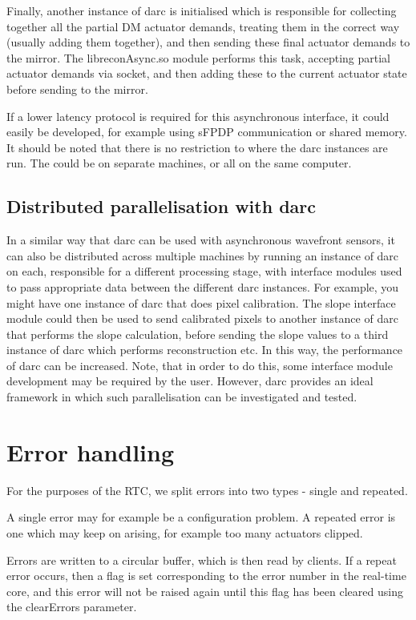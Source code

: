 \documentclass[a4,10pt]{article}
\begin{document}
Finally, another instance of darc is initialised which is responsible
for collecting together all the partial DM actuator demands, treating
them in the correct way (usually adding them together), and then
sending these final actuator demands to the mirror.  The
libreconAsync.so module performs this task, accepting partial actuator
demands via socket, and then adding these to the current actuator
state before sending to the mirror.  

If a lower latency protocol is required for this asynchronous
interface, it could easily be developed, for example using sFPDP
communication or shared memory.  It should be noted that there is no
restriction to where the darc instances are run.  The could be on
separate machines, or all on the same computer.

\subsection{Distributed parallelisation with darc}
In a similar way that darc can be used with asynchronous wavefront
sensors, it can also be distributed across multiple machines by
running an instance of darc on each, responsible for a different
processing stage, with interface modules used to pass appropriate data
between the different darc instances.  For example, you might have one
instance of darc that does pixel calibration.  The slope interface
module could then be used to send calibrated pixels to another
instance of darc that performs the slope calculation, before sending
the slope values to a third instance of darc which performs
reconstruction etc.  In this way, the performance of darc can be
increased.  Note, that in order to do this, some interface module
development may be required by the user.  However, darc provides an
ideal framework in which such parallelisation can be investigated and
tested.


\section{Error handling}
For the purposes of the RTC, we split errors into two types - single
and repeated.  

A single error may for example be a configuration problem.  A repeated
error is one which may keep on arising, for example too many actuators
clipped.  

Errors are written to a circular buffer, which is then read by
clients.  If a repeat error occurs, then a flag is set corresponding
to the error number in the real-time core, and this error will not be
raised again until this flag has been cleared using the clearErrors
parameter.  
\end{document}
